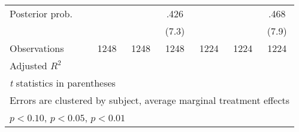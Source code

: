 \begin{table}[htbp]
\begin{tabular}{l*{6}{c}}
Posterior prob. &                  &                  &     .426\sym{***}&                  &                  &     .468\sym{***}\\
                &                  &                  &    (7.3)         &                  &                  &    (7.9)         \\
\hline
Observations    &     1248         &     1248         &     1248         &     1224         &     1224         &     1224         \\
Adjusted \(R^{2}\)&                  &                  &                  &                  &                  &                  \\
\hline\hline
\multicolumn{7}{l}{\footnotesize \textit{t} statistics in parentheses}\\
\multicolumn{7}{l}{\footnotesize Errors are clustered by subject, average marginal treatment effects}\\
\multicolumn{7}{l}{\footnotesize \sym{*} \(p<0.10\), \sym{**} \(p<0.05\), \sym{***} \(p<0.01\)}\\
\end{tabular}
\end{table}
